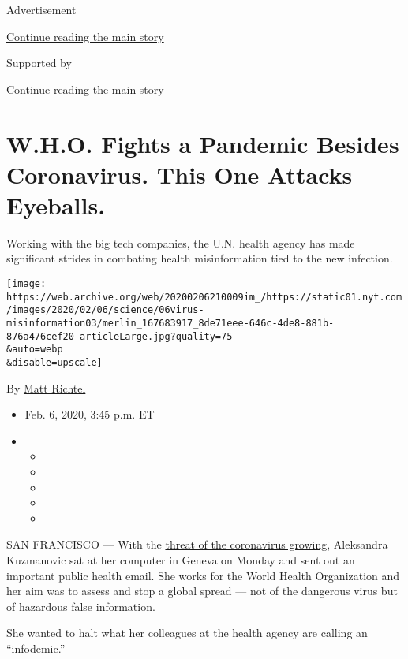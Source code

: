 Advertisement

\protect\hyperlink{after-top}{Continue reading the main story}

Supported by

\protect\hyperlink{after-sponsor}{Continue reading the main story}

\hypertarget{who-fights-a-pandemic-besides-coronavirus-this-one-attacks-eyeballs}{%
\section{W.H.O. Fights a Pandemic Besides Coronavirus. This One Attacks
Eyeballs.}\label{who-fights-a-pandemic-besides-coronavirus-this-one-attacks-eyeballs}}

Working with the big tech companies, the U.N. health agency has made
significant strides in combating health misinformation tied to the new
infection.

\texttt{[image: https://web.archive.org/web/20200206210009im\_/https://static01.nyt.com/images/2020/02/06/science/06virus-misinformation03/merlin\_167683917\_8de71eee-646c-4de8-881b-876a476cef20-articleLarge.jpg?quality=75\\\&auto=webp\\\&disable=upscale]}

By
\href{https://web.archive.org/web/20200206210009/https://www.nytimes.com/by/matt-richtel}{Matt
Richtel}

\begin{itemize}
\item
  Feb. 6, 2020, 3:45 p.m. ET
\item
  \begin{itemize}
  \item
  \item
  \item
  \item
  \item
  \end{itemize}
\end{itemize}

SAN FRANCISCO --- With the
\href{https://web.archive.org/web/20200206210009/https://www.nytimes.com/2020/02/02/health/coronavirus-pandemic-china.html}{threat
of the coronavirus growing}, Aleksandra Kuzmanovic sat at her computer
in Geneva on Monday and sent out an important public health email. She
works for the World Health Organization and her aim was to assess and
stop a global spread --- not of the dangerous virus but of hazardous
false information.

She wanted to halt what her colleagues at the health agency are calling
an ``infodemic.''

